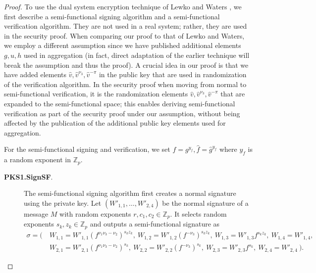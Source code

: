 \documentclass[11pt,letterpaper]{article}
\newcommand{\Z}{\mathbb{Z}}
\begin{document}
\begin{proof}
To use the dual system encryption technique of Lewko and Waters
\cite{LewkoW10}, we first describe a semi-functional signing algorithm and a
semi-functional verification algorithm. They are not used in a real system;
rather, they are used in the security proof.
When comparing our proof to that of Lewko and Waters, we employ a different
assumption since we have published additional elements $g, u, h$ used in
aggregation (in fact, direct adaptation of the earlier technique will break
the assumption and thus the proof). A crucial idea in our proof is that we
have added elements $\hat{v}, \hat{v}^{\nu_3}, \hat{v}^{-\pi}$ in the public
key that are used in randomization of the verification algorithm. In the
security proof when moving from normal to semi-functional verification, it is
the randomization elements $\hat{v}, \hat{v}^{\nu_3}, \hat{v}^{-\pi}$ that
are expanded to the semi-functional space; this enables deriving
semi-functional verification as part of the security proof under our
assumption, without being affected by the publication of the additional
public key elements used for aggregation.

For the semi-functional signing and verification, we set $f = g^{y_f},
\hat{f} = \hat{g}^{y_f}$ where $y_f$ is a random exponent in $\Z_p$.

\begin{description}
\item [\textbf{PKS1.SignSF}.] The semi-functional signing algorithm first
    creates a normal signature using the private key. Let $(W'_{1,1},
    \ldots, W'_{2,4})$ be the normal signature of a message $M$ with random
    exponents $r, c_1, c_2 \in \Z_p$. It selects random exponents $s_k, z_k
    \in \Z_p$ and outputs a semi-functional signature as
    \begin{align*}
    \sigma = \Big(~
    &   W_{1,1} = W'_{1,1} (f^{\nu_1 \nu_3 - \nu_2})^{s_k z_k},~
        W_{1,2} = W'_{1,2} (f^{-\nu_3})^{s_k z_k},~
        W_{1,3} = W'_{1,3} f^{s_k z_k},~
        W_{1,4} = W'_{1,4},~\\
    &   W_{2,1} = W'_{2,1} (f^{\nu_1 \nu_3 - \nu_2})^{s_k},~
        W_{2,2} = W'_{2,2} (f^{-\nu_3})^{s_k},~
        W_{2,3} = W'_{2,3} f^{s_k},~
        W_{2,4} = W'_{2,4}
    ~\Big).
    \end{align*}


\end{description}
\end{proof}
\end{document}
